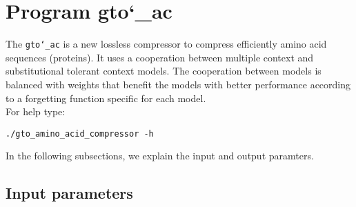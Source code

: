 \section{Program gto\char`_ac}
The \texttt{gto\char`_ac} is a new lossless compressor to compress efficiently amino acid sequences (proteins). It uses a cooperation between multiple context and substitutional tolerant context models. The cooperation between models is balanced with weights that benefit the models with better performance according to a forgetting function specific for each model.\\
For help type:
\begin{lstlisting}
./gto_amino_acid_compressor -h
\end{lstlisting}
In the following subsections, we explain the input and output paramters.

\subsection*{Input parameters}

